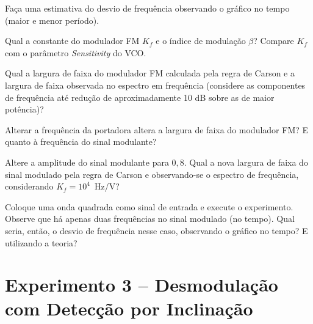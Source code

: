 \documentclass[12pt,addpoints]{exam}
\begin{document}
\begin{questions}
    \question Faça uma estimativa do desvio de frequência observando o gráfico no tempo (maior e menor período). 
    \fillwithlines{0.25in}
    
    \question Qual a constante do modulador FM $K_{f}$ e o índice de modulação $\beta$? Compare $K_{f}$ com o parâmetro {\it Sensitivity} do VCO.
    \fillwithlines{0.5in}
    
    \question Qual a largura de faixa do modulador FM calculada pela regra de Carson e a largura de faixa observada no espectro em frequência (considere as componentes de frequência até redução de aproximadamente 10 dB sobre as de maior potência)?
    \fillwithlines{0.25in}
    
    \question Alterar a frequência da portadora altera a largura de faixa do modulador FM? E quanto à frequência do sinal modulante?
    \fillwithlines{0.5in}
    
    \question Altere a amplitude do sinal modulante para $0,8$. Qual a nova largura de faixa do sinal modulado pela regra de Carson e observando-se o espectro de frequência, considerando $K_{f} = 10^{4}$~Hz/V?
    \fillwithlines{0.25in}
    
    \question Coloque uma onda quadrada como sinal de entrada e execute o experimento. Observe que há apenas duas frequências no sinal modulado (no tempo). Qual seria, então, o desvio de frequência nesse caso, observando o gráfico no tempo? E utilizando a teoria?
    \fillwithlines{0.25in}
\end{questions}

%
%    

\section*{Experimento 3 -- Desmodulação com Detecção por Inclinação}
\end{document}
